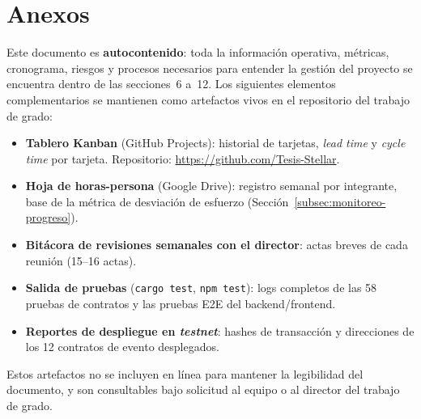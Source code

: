\documentclass[12pt,oneside]{report}
\begin{document}
  \section*{Anexos}
  \label{sec:anexos}
    Este documento es \textbf{autocontenido}: toda la información operativa, métricas, cronograma, riesgos y procesos necesarios para entender la gestión del proyecto se encuentra dentro de las secciones~6 a~12. Los siguientes elementos complementarios se mantienen como artefactos vivos en el repositorio del trabajo de grado:
    \begin{itemize}
      \item \textbf{Tablero Kanban} (GitHub Projects): historial de tarjetas, \textit{lead time} y \textit{cycle time} por tarjeta. Repositorio: \url{https://github.com/Tesis-Stellar}.
      \item \textbf{Hoja de horas-persona} (Google Drive): registro semanal por integrante, base de la métrica de desviación de esfuerzo (Sección~\ref{subsec:monitoreo-progreso}).
      \item \textbf{Bitácora de revisiones semanales con el director}: actas breves de cada reunión (15--16 actas).
      \item \textbf{Salida de pruebas} (\texttt{cargo test}, \texttt{npm test}): logs completos de las 58 pruebas de contratos y las pruebas E2E del backend/frontend.
      \item \textbf{Reportes de despliegue en \textit{testnet}}: hashes de transacción y direcciones de los 12 contratos de evento desplegados.
    \end{itemize}
    Estos artefactos no se incluyen en línea para mantener la legibilidad del documento, y son consultables bajo solicitud al equipo o al director del trabajo de grado.

\end{document}
